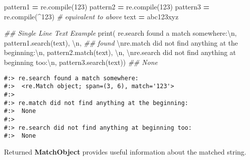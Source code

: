\documentclass[
]{book}
\newenvironment{Shaded}{\begin{snugshade}}{\end{snugshade}}
\newcommand{\BuiltInTok}[1]{#1}
\newcommand{\CharTok}[1]{\textcolor[rgb]{0.5,0.5,0.5}{#1}}
\newcommand{\CommentTok}[1]{\textcolor[rgb]{0.37,0.37,0.37}{\textit{#1}}}
\newcommand{\NormalTok}[1]{#1}
\newcommand{\OperatorTok}[1]{\textcolor[rgb]{0.43,0.43,0.43}{\textbf{#1}}}
\newcommand{\StringTok}[1]{\textcolor[rgb]{0.5,0.5,0.5}{#1}}
\begin{document}
\begin{Shaded}
\begin{Highlighting}[]
\NormalTok{pattern1 }\OperatorTok{=}\NormalTok{ re.}\BuiltInTok{compile}\NormalTok{(}\StringTok{\textquotesingle{}123\textquotesingle{}}\NormalTok{) }
\NormalTok{pattern2 }\OperatorTok{=}\NormalTok{ re.}\BuiltInTok{compile}\NormalTok{(}\StringTok{\textquotesingle{}123\textquotesingle{}}\NormalTok{)}
\NormalTok{pattern3 }\OperatorTok{=}\NormalTok{ re.}\BuiltInTok{compile}\NormalTok{(}\StringTok{\textquotesingle{}\^{}123\textquotesingle{}}\NormalTok{)  }\CommentTok{\# equivalent to above}
\NormalTok{text }\OperatorTok{=} \StringTok{\textquotesingle{}abc123xyz\textquotesingle{}}

\CommentTok{\#\# Single Line Text Example}
\BuiltInTok{print}\NormalTok{( }\StringTok{\textquotesingle{}re.search found a match somewhere:}\CharTok{\textbackslash{}n}\StringTok{\textquotesingle{}}\NormalTok{,}
\NormalTok{       pattern1.search(text), }\StringTok{\textquotesingle{}}\CharTok{\textbackslash{}n}\StringTok{\textquotesingle{}}\NormalTok{, }\CommentTok{\#\# found}
       \StringTok{\textquotesingle{}}\CharTok{\textbackslash{}n}\StringTok{re.match did not find anything at the beginning:}\CharTok{\textbackslash{}n}\StringTok{\textquotesingle{}}\NormalTok{,}
\NormalTok{       pattern2.match(text), }\StringTok{\textquotesingle{}}\CharTok{\textbackslash{}n}\StringTok{\textquotesingle{}}\NormalTok{,}
       \StringTok{\textquotesingle{}}\CharTok{\textbackslash{}n}\StringTok{re.search did not find anything at beginning too:}\CharTok{\textbackslash{}n}\StringTok{\textquotesingle{}}\NormalTok{,}
\NormalTok{       pattern3.search(text))        }\CommentTok{\#\# None}
\end{Highlighting}
\end{Shaded}

\begin{verbatim}
#:> re.search found a match somewhere:
#:>  <re.Match object; span=(3, 6), match='123'> 
#:>  
#:> re.match did not find anything at the beginning:
#:>  None 
#:>  
#:> re.search did not find anything at beginning too:
#:>  None
\end{verbatim}

Returned \textbf{MatchObject} provides useful information about the matched string.
\end{document}

